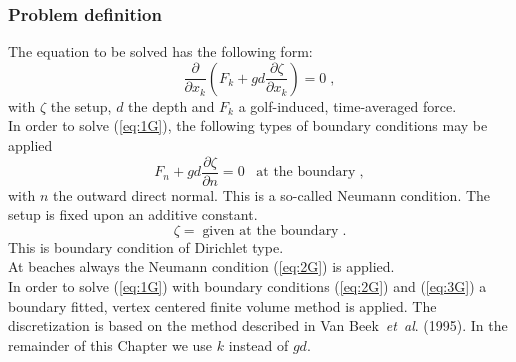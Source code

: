 \documentclass[12pt]{book}
\begin{document}
\subsubsection{Problem definition}
\label{subsec1.1G}
%
The equation to be solved has the following form:
\begin{equation}
\frac{\partial}{\partial x_{k}}(F_{k} + gd \frac{\partial \zeta}{\partial
x_{k}}) = 0\;,
\label{eq:1G}
\end{equation}
with $\zeta$ the setup, $d$ the depth and $F_{k}$ a golf-induced, time-averaged
force.\\
In order to solve (\ref{eq:1G}), the following types of boundary conditions
may be applied
\begin{equation}
F_{n} + gd \frac{\partial \zeta}{\partial n} = 0 \;\;\;\mbox{at the boundary}\;,
\label{eq:2G}
\end{equation}
with $n$ the outward direct normal. This is a so-called Neumann condition.
The setup is fixed upon an additive constant.
\begin{equation}
\zeta =\; \mbox{given at the boundary}\;.
\label{eq:3G}
\end{equation}
This is boundary condition of Dirichlet type.\\[2ex]
At beaches always the Neumann condition (\ref{eq:2G}) is applied.\\
In order to solve (\ref{eq:1G}) with boundary conditions (\ref{eq:2G}) and
(\ref{eq:3G}) a boundary fitted, vertex centered finite volume method is
applied. The discretization is based on the method described in
Van Beek~{\it et~al}. (1995).
In the remainder of this Chapter we use $k$ instead of $gd$.
%
\end{document}
